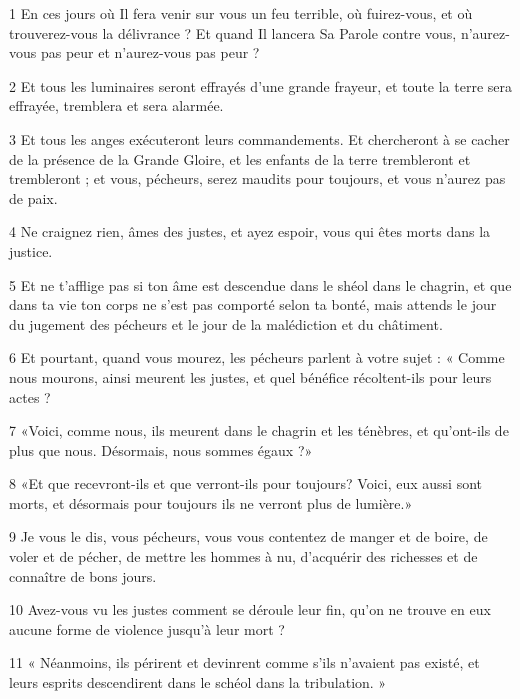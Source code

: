 \par 1 En ces jours où Il fera venir sur vous un feu terrible, où fuirez-vous, et où trouverez-vous la délivrance ? Et quand Il lancera Sa Parole contre vous, n'aurez-vous pas peur et n'aurez-vous pas peur ?
\par 2 Et tous les luminaires seront effrayés d'une grande frayeur, et toute la terre sera effrayée, tremblera et sera alarmée.
\par 3 Et tous les anges exécuteront leurs commandements. Et chercheront à se cacher de la présence de la Grande Gloire, et les enfants de la terre trembleront et trembleront ; et vous, pécheurs, serez maudits pour toujours, et vous n'aurez pas de paix.
\par 4 Ne craignez rien, âmes des justes, et ayez espoir, vous qui êtes morts dans la justice.
\par 5 Et ne t'afflige pas si ton âme est descendue dans le shéol dans le chagrin, et que dans ta vie ton corps ne s'est pas comporté selon ta bonté, mais attends le jour du jugement des pécheurs et le jour de la malédiction et du châtiment.
\par 6 Et pourtant, quand vous mourez, les pécheurs parlent à votre sujet : « Comme nous mourons, ainsi meurent les justes, et quel bénéfice récoltent-ils pour leurs actes ?
\par 7 «Voici, comme nous, ils meurent dans le chagrin et les ténèbres, et qu'ont-ils de plus que nous. Désormais, nous sommes égaux ?»
\par 8 «Et que recevront-ils et que verront-ils pour toujours? Voici, eux aussi sont morts, et désormais pour toujours ils ne verront plus de lumière.»
\par 9 Je vous le dis, vous pécheurs, vous vous contentez de manger et de boire, de voler et de pécher, de mettre les hommes à nu, d'acquérir des richesses et de connaître de bons jours.
\par 10 Avez-vous vu les justes comment se déroule leur fin, qu'on ne trouve en eux aucune forme de violence jusqu'à leur mort ?
\par 11 « Néanmoins, ils périrent et devinrent comme s'ils n'avaient pas existé, et leurs esprits descendirent dans le schéol dans la tribulation. »


